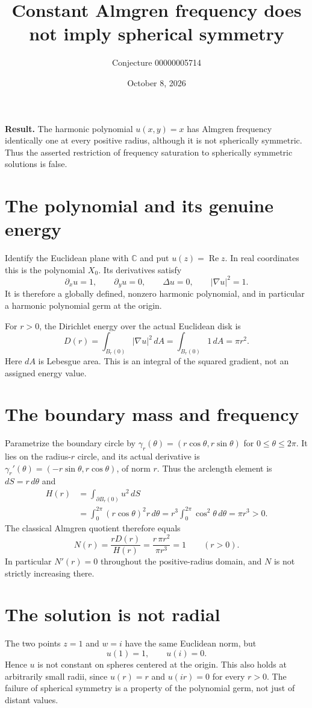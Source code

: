 \documentclass[11pt]{article}
\title{Constant Almgren frequency does not imply spherical symmetry}
\author{Conjecture 00000005714}
\date{October 8, 2026}
\begin{document}
\maketitle
\noindent\textbf{Result.} The harmonic polynomial $u(x,y)=x$ has Almgren frequency identically one at every positive radius, although it is not spherically symmetric. Thus the asserted restriction of frequency saturation to spherically symmetric solutions is false.

\section*{The polynomial and its genuine energy}
Identify the Euclidean plane with $\mathbb C$ and put $u(z)=\operatorname{Re}z$. In real coordinates this is the polynomial $X_0$. Its derivatives satisfy
\[
 \partial_xu=1,\qquad\partial_yu=0,\qquad
 \Delta u=0,\qquad |\nabla u|^2=1.
\]
It is therefore a globally defined, nonzero harmonic polynomial, and in particular a harmonic polynomial germ at the origin.

For $r>0$, the Dirichlet energy over the actual Euclidean disk is
\[
 D(r)=\int_{B_r(0)}|\nabla u|^2\,dA
 =\int_{B_r(0)}1\,dA=\pi r^2.
\]
Here $dA$ is Lebesgue area. This is an integral of the squared gradient, not an assigned energy value.

\section*{The boundary mass and frequency}
Parametrize the boundary circle by
$\gamma_r(\theta)=(r\cos\theta,r\sin\theta)$ for $0\leq\theta\leq2\pi$.
It lies on the radius-$r$ circle, and its actual derivative is
$\gamma_r'(\theta)=(-r\sin\theta,r\cos\theta)$, of norm $r$. Thus the arclength element is $dS=r\,d\theta$ and
\[
 \begin{aligned}
 H(r)&=\int_{\partial B_r(0)}u^2\,dS\\
 &=\int_0^{2\pi}(r\cos\theta)^2r\,d\theta
 =r^3\int_0^{2\pi}\cos^2\theta\,d\theta=\pi r^3>0.
 \end{aligned}
\]
The classical Almgren quotient therefore equals
\[
 N(r)=\frac{rD(r)}{H(r)}
 =\frac{r\,\pi r^2}{\pi r^3}=1\qquad(r>0).
\]
In particular $N'(r)=0$ throughout the positive-radius domain, and $N$ is not strictly increasing there.

\newpage
\section*{The solution is not radial}
The two points $z=1$ and $w=i$ have the same Euclidean norm, but
\[
 u(1)=1,\qquad u(i)=0.
\]
Hence $u$ is not constant on spheres centered at the origin. This also holds at arbitrarily small radii, since $u(r)=r$ and $u(ir)=0$ for every $r>0$. The failure of spherical symmetry is a property of the polynomial germ, not just of distant values.
\end{document}
